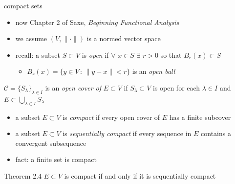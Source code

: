 \documentclass[10pt,
               svgnames,
               hyperref={colorlinks,
                         citecolor=DeepPink4,
                         linkcolor=FireBrick,
                         urlcolor=Maroon},
               usepdftitle=false]{beamer}
\newcommand{\textbook}{Saxe, \emph{Beginning Functional Analysis}}
\begin{document}
\begin{frame}{compact sets}

\begin{itemize}
\item now Chapter 2 of \textbook
\item we assume $(V,\|\cdot\|)$ is a normed vector space
\item recall: a subset $S\subset V$ is \emph{open} if $\forall$ $x\in S$ $\exists$ $r>0$ so that $B_r(x)\subset S$

     \begin{itemize}
     \item[$\circ$] $B_r(x)=\{y\in V\,:\,\|y-x\| < r\}$ is an \emph{open ball}
     \end{itemize}
\end{itemize}

\begin{definition}
$\mathcal{C}=\{S_\lambda\}_{\lambda\in I}$ is an \emph{open cover of } $E\subset V$ if $S_\lambda\subset V$ is open for each $\lambda \in I$ and $E \subset \bigcup_{\lambda\in I} S_\lambda$
\end{definition}

\begin{definition}
\begin{itemize}
\item a subset $E\subset V$ is \emph{compact} if every open cover of $E$ has a finite subcover
\item a subset $E\subset V$ is \emph{sequentially compact} if every sequence in $E$ contains a convergent subsequence
\end{itemize}
\end{definition}

\begin{itemize}
\item fact: a finite set is compact
\end{itemize}

\begin{block}{Theorem 2.4}
$E\subset V$ is compact if and only if it is sequentially compact
\end{block}

\end{frame}
\end{document}
